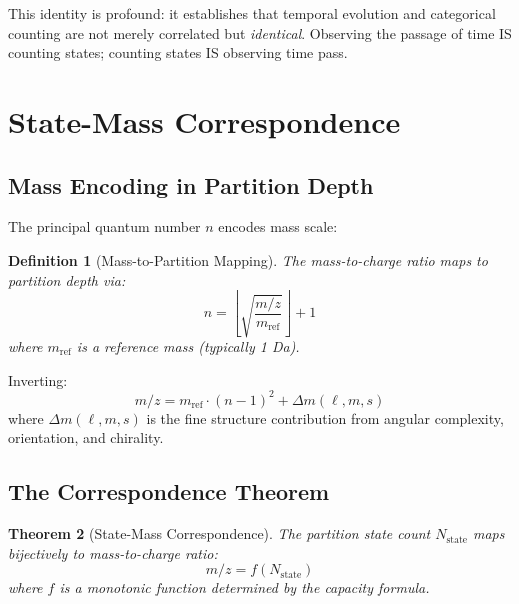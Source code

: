 \documentclass[twocolumn,10pt]{article}
\newtheorem{theorem}{Theorem}[section]
\newtheorem{definition}[theorem]{Definition}
\begin{document}
This identity is profound: it establishes that temporal evolution and categorical counting are not merely correlated but \emph{identical}. Observing the passage of time IS counting states; counting states IS observing time pass.

\section{State-Mass Correspondence}
\label{sec:correspondence}

\subsection{Mass Encoding in Partition Depth}

The principal quantum number $n$ encodes mass scale:

\begin{definition}[Mass-to-Partition Mapping]
\label{def:mass_partition}
The mass-to-charge ratio maps to partition depth via:
\begin{equation}
    n = \left\lfloor \sqrt{\frac{m/z}{m_{\text{ref}}}} \right\rfloor + 1
\end{equation}
where $m_{\text{ref}}$ is a reference mass (typically 1 Da).
\end{definition}

Inverting:
\begin{equation}
    m/z = m_{\text{ref}} \cdot (n-1)^2 + \Delta m(\ell, m, s)
\end{equation}
where $\Delta m(\ell, m, s)$ is the fine structure contribution from angular complexity, orientation, and chirality.

\subsection{The Correspondence Theorem}

\begin{theorem}[State-Mass Correspondence]
\label{thm:correspondence}
The partition state count $N_{\text{state}}$ maps bijectively to mass-to-charge ratio:
\begin{equation}
    m/z = f(N_{\text{state}})
\end{equation}
where $f$ is a monotonic function determined by the capacity formula.
\end{theorem}
\end{document}
